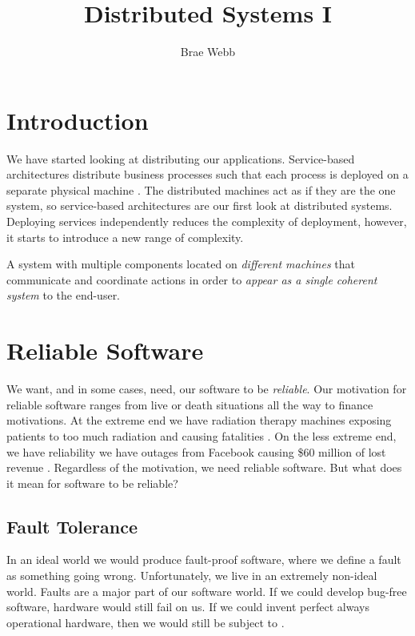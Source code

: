 \title{Distributed Systems I}
\author{Brae Webb}
\date{}

\maketitle

\section{Introduction}
We have started looking at distributing our applications.
Service-based architectures distribute business processes such that each process is deployed on a separate physical machine \cite{service-based-notes}.
The distributed machines act as if they are the one system,
so service-based architectures are our first look at distributed systems.
Deploying services independently reduces the complexity of deployment,
however, it starts to introduce a new range of complexity.

\begin{definition}
A system with multiple components located on \textsl{different machines} that communicate and coordinate actions in order to \textsl{appear as a single coherent system} to the end-user.
\end{definition}

\section{Reliable Software}
We want, and in some cases, need, our software to be \textsl{reliable}.
Our motivation for reliable software ranges from live or death situations all the way to finance motivations.
At the extreme end we have radiation therapy machines exposing patients to too much radiation and causing fatalities \cite{therac}.
On the less extreme end,
we have reliability we have outages from Facebook causing \$60 million of lost revenue \cite{facebook-outage}.
Regardless of the motivation,
we need reliable software.
But what does it mean for software to be reliable?

\subsection{Fault Tolerance}
In an ideal world we would produce fault-proof software,
where we define a fault as something going wrong.
Unfortunately, we live in an extremely non-ideal world.
Faults are a major part of our software world.
If we could develop bug-free software,
hardware would still fail on us.
If we could invent perfect always operational hardware,
then we would still be subject to .


